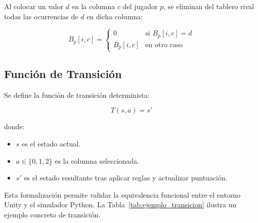 Al colocar un valor $d$ en la columna $c$ del jugador $p$, se eliminan del tablero rival todas las ocurrencias de $d$ en dicha columna:

\[
B_{\bar{p}}[i,c] =
\begin{cases}
0 & \text{si } B_{\bar{p}}[i,c] = d \\
B_{\bar{p}}[i,c] & \text{en otro caso}
\end{cases}
\]

\subsection{Función de Transición}

Se define la función de transición determinista:

\[
T(s, a) = s'
\]

donde:

\begin{itemize}
    \item $s$ es el estado actual.
    \item $a \in \{0,1,2\}$ es la columna seleccionada.
    \item $s'$ es el estado resultante tras aplicar reglas y actualizar puntuación.
\end{itemize}

Esta formalización permite validar la equivalencia funcional entre el entorno Unity y el simulador Python. La Tabla~\ref{tab:ejemplo_transicion} ilustra un ejemplo concreto de transición.

